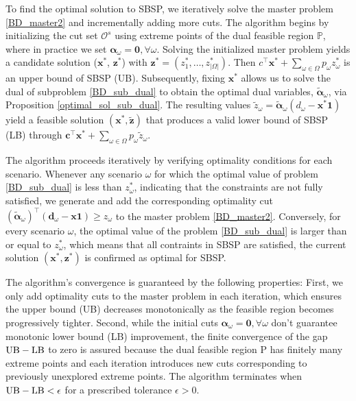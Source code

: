 To find the optimal solution to SBSP, we iteratively solve the master problem \eqref{BD_master2} and incrementally adding more cuts. The algorithm begins by initializing the cut set $\mathcal{O}^{s}$ using extreme points of the dual feasible region $\mathbb{P}$, where in practice we set $\bm{\alpha}_{\omega} = \mathbf{0}, \forall \omega$. Solving the initialized master problem yields a candidate solution ($\mathbf{x}^{*}$, $\mathbf{z}^{*}$) with $\mathbf{z}^{*} =(z^{*}_1,\ldots, z^{*}_{|\Omega|})$. Then $c^{\intercal} \mathbf{x}^{*} + \sum_{\omega \in \Omega} p_{\omega} z_{\omega}^{*}$ is an upper bound of SBSP (UB). Subsequently, fixing $\mathbf{x}^{*}$ allows us to solve the dual of subproblem \eqref{BD_sub_dual} to obtain the optimal dual variables, $\bm{\tilde{\alpha}}_{\omega}$, via Proposition \ref{optimal_sol_sub_dual}. The resulting values $\tilde{z}_{\omega} = \bm{\tilde{\alpha}}_{\omega}(d_{\omega} - \mathbf{x}^{*} \mathbf{1})$ yield a feasible solution $(\mathbf{x}^{*}, \mathbf{\tilde{z}})$ that produces a valid lower bound of SBSP (LB) through $\mathbf{c}^{\intercal} \mathbf{x}^{*} + \sum_{\omega \in \Omega} p_{\omega} \tilde{z}_{\omega}$.

The algorithm proceeds iteratively by verifying optimality conditions for each scenario. Whenever any scenario $\omega$ for which the optimal value of problem \eqref{BD_sub_dual} is less than $z_{\omega}^{*}$, indicating that the constraints are not fully satisfied, we generate and add the corresponding optimality cut $(\bm{\tilde{\alpha}}_{\omega})^{\intercal}(\mathbf{d}_{\omega} - \mathbf{x} \mathbf{1}) \geq z_{\omega}$ to the master problem \eqref{BD_master2}. Conversely, for every scenario $\omega$, the optimal value of the problem \eqref{BD_sub_dual} is larger than or equal to $z_{\omega}^{*}$, which means that all contraints in SBSP are satisfied, the current solution $(\mathbf{x}^{*}, \mathbf{z}^{*})$ is confirmed as optimal for SBSP.

The algorithm's convergence is guaranteed by the following properties: First, we only add optimality cuts to the master problem in each iteration, which ensures the upper bound (UB) decreases monotonically as the feasible region becomes progressively tighter. Second, while the initial cuts $\bm{\alpha}_{\omega} = \mathbf{0}, \forall \omega$ don't guarantee monotonic lower bound (LB) improvement, the finite convergence of the gap $\textup{UB} - \textup{LB}$ to zero is assured because the dual feasible region P has finitely many extreme points and each iteration introduces new cuts corresponding to previously unexplored extreme points. The algorithm terminates when $\textup{UB} - \textup{LB} < \epsilon$ for a prescribed tolerance $\epsilon >0$.


